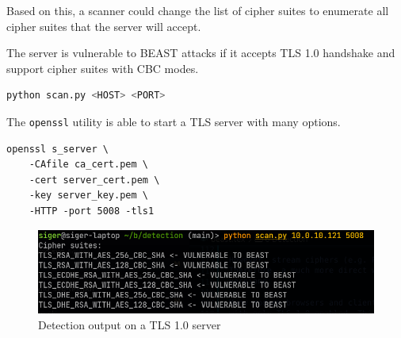 \documentclass{acm_proc_article-sp}
\begin{document}
Based on this, a scanner could change the list of cipher suites to enumerate all
cipher suites that the server will accept.

The server is vulnerable to BEAST attacks if it accepts TLS 1.0 handshake and support
cipher suites with CBC modes.

\begin{lstlisting}[language=bash]
python scan.py <HOST> <PORT>
\end{lstlisting}

The \texttt{openssl} utility is able to start a TLS server with many options.

\begin{lstlisting}
openssl s_server \
    -CAfile ca_cert.pem \
    -cert server_cert.pem \
    -key server_key.pem \
    -HTTP -port 5008 -tls1
\end{lstlisting}

\begin{figure}[htb]
    \centering
    \includegraphics[keepaspectratio, width=\linewidth]{./figures/detection-output.png}
    \caption{Detection output on a TLS 1.0 server}
\end{figure}


%
%
\balancecolumns
\appendix
\balancecolumns
\end{document}
